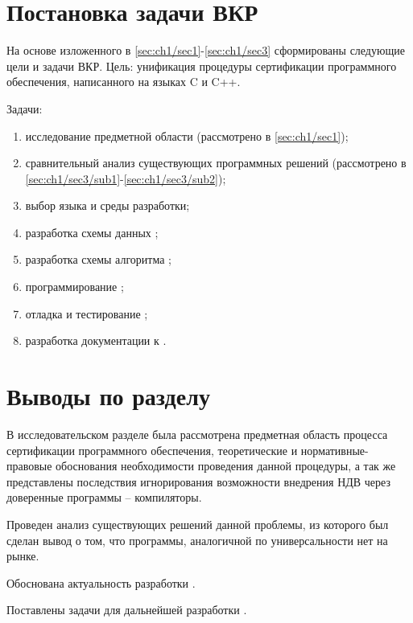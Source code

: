 \section{Постановка задачи ВКР}\label{sec:ch1/sec4}
На основе изложенного в \autoref{sec:ch1/sec1}-\autoref{sec:ch1/sec3} сформированы
следующие цели и задачи ВКР.
Цель: унификация процедуры сертификации программного обеспечения, написанного
на языках C и C++.

Задачи:
\begin{enumerate}[label={\arabic*)}]
    \item исследование предметной области (рассмотрено в \autoref{sec:ch1/sec1});
    \item сравнительный анализ существующих программных решений 
        (рассмотрено в \autoref{sec:ch1/sec3/sub1}-\autoref{sec:ch1/sec3/sub2});
    \item выбор языка и среды разработки;
    \item разработка схемы данных {\ProgModule};
    \item разработка схемы алгоритма {\ProgModule};
    \item программирование {\ProgModule};
    \item отладка и тестирование {\ProgModule};
    \item разработка документации к {\ProgModule}.
\end{enumerate}

\section{Выводы по разделу}\label{sec:ch1/sec5}
В исследовательском разделе была рассмотрена предметная область процесса
сертификации программного обеспечения, теоретические и нормативные-правовые 
обоснования необходимости проведения данной процедуры, а так же представлены
последствия игнорирования возможности внедрения НДВ  через доверенные программы --
компиляторы.

Проведен анализ существующих решений данной проблемы, из которого был сделан
вывод о том, что программы, аналогичной по универсальности {\ProgModule} нет на рынке.

Обоснована актуальность разработки {\ProgModule}.

Поставлены задачи для дальнейшей разработки {\ProgModule}.
